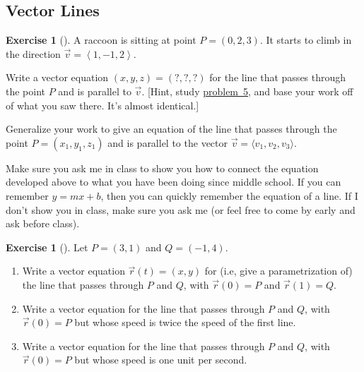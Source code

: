 \documentclass[10pt,]{book}
\theoremstyle{plain}
\theoremstyle{definition}
\theoremstyle{definition}
\theoremstyle{definition}
\theoremstyle{definition}
\newtheorem{exploration}[project]{Exercise}
\theoremstyle{definition}
\numberwithin{equation}{section}
\newcommand{\lt}{<}
\begin{document}
\subsection[{Vector Lines}]{Vector Lines}\label{subsection-7}
\begin{exploration}[]\label{exploration-27}
A raccoon is sitting at point \(P=(0,2,3)\). It starts to climb in the direction \(\vec v=\left\lt 1,-1,2\right>\).%
\par
Write a vector equation \((x,y,z)=(?,?,?)\) for the line that passes through the point \(P\) and is parallel to \(\vec v\). [Hint, study \hyperref[prob_horseline]{problem~5}, and base your work off of what you saw there. It's almost identical.]%
\par
Generalize your work to give an equation of the line that passes through the point \(P=(x_1,y_1,z_1)\) and is parallel to the vector \(\vec v=\langle v_1,v_2,v_3 \rangle\).%
\end{exploration}
Make sure you ask me in class to show you how to connect the equation developed above to what you have been doing since middle school. If you can remember \(y=mx+b\), then you can quickly remember the equation of a line. If I don't show you in class, make sure you ask me (or feel free to come by early and ask before class).%
\begin{exploration}[]\label{first_line_between_two_points}
Let \(P=(3,1)\) and \(Q=(-1,4)\).%
\begin{enumerate}[font=\bfseries,label=(\alph*),ref=\alph*]
\item\label{task-57} Write a vector equation \(\vec r(t)=(x,y)\) for (i.e, give a parametrization of) the line that passes through \(P\) and \(Q\), with \(\vec r(0)=P\) and \(\vec r(1)=Q\).%
\item\label{task-58} Write a vector equation for the line that passes through \(P\) and \(Q\), with \(\vec r(0)=P\) but whose speed is twice the speed of the first line.%
\item\label{task-59} Write a vector equation for the line that passes through \(P\) and \(Q\), with \(\vec r(0)=P\) but whose speed is one unit per second.%
\end{enumerate}
\end{exploration}
\typeout{************************************************}
\typeout{************************************************}
\end{document}
